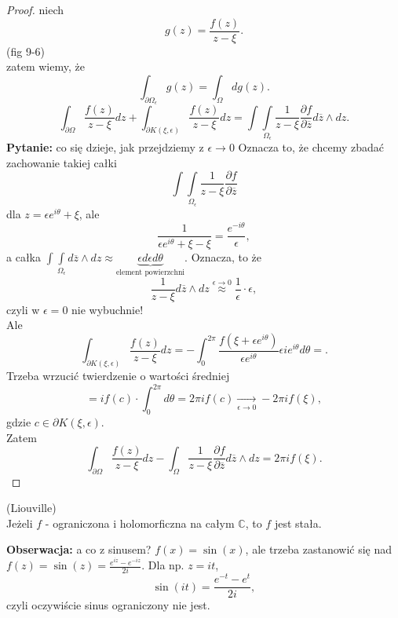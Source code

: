 \documentclass[../main.tex]{subfiles}
\begin{document}
 \begin{proof}
     niech
     \[
         g(z) = \frac{f(z)}{z - \xi}
     .\]
 (fig 9-6)\\
     zatem wiemy, że
     \[
         \int_{\partial \Omega_\epsilon}g(z) = \int_{\Omega} d g(z)
     .\]
 \[
     \int_{\partial \Omega} \frac{f(z)}{z - \xi}dz + \int_{\partial K(\xi, \epsilon)} \frac{f(z)}{z - \xi}dz = \int\int\limits_{\Omega_\epsilon}\frac{1}{z-\xi} \frac{\partial f}{\partial \overline{z}} d\overline{z}\land dz
 .\]
 \textbf{Pytanie:} co się dzieje, jak przejdziemy z $\epsilon\to 0$ Oznacza to, że chcemy zbadać zachowanie takiej całki
     \[
         \int\int\limits_{\Omega_{\epsilon}} \frac{1}{z-\xi}\frac{\partial f}{\partial \overline{z}}
     \]
 dla $z = \epsilon e^{i\theta} + \xi$, ale
     \[
         \frac{1}{\epsilon e^{i\theta} + \xi - \xi} = \frac{e^{-i\theta}}{\epsilon}
     ,\]
 a całka $\int\int\limits_{\Omega_\epsilon} d\overline{z}\land dz \approx \underbrace{\epsilon d\epsilon d\theta}_{\text{element powierzchni}}$.
     Oznacza, to że
     \[
         \frac{1}{z-\xi} d\overline{z}\land dz \overset{\epsilon \to 0}{\approx} \frac{1}{\epsilon} \cdot \epsilon
     ,\]
 czyli w $\epsilon = 0$ nie wybuchnie!\\
     Ale
     \[
         \int_{\partial K(\xi, \epsilon)} \frac{f(z)}{z-\xi} dz = - \int_0^{2\pi} \frac{f(\xi + \epsilon e^{i\theta})}{\epsilon e^{i\theta}} \epsilon i e^{i\theta} d\theta =
     .\]
 Trzeba wrzucić twierdzenie o wartości średniej
     \[
         = i f(c) \cdot \int_{0}^{2\pi}d\theta = 2 \pi i f(c) \underset{\epsilon \to 0}{\longrightarrow}-2\pi i f(\xi)
     ,\]
 gdzie $c\in \partial K(\xi, \epsilon)$.\\
     Zatem
     \[
         \int_{\partial \Omega} \frac{f(z)}{z - \xi}dz - \int_{\Omega}\frac{1}{z-\xi}\frac{\partial f}{\partial \overline{z}} d\overline{z}\land dz = 2 \pi i f(\xi)
     .\]
\end{proof}
\begin{tw}
    (Liouville)\\
    Jeżeli $f$ - ograniczona i holomorficzna na całym $\mathbb{C}$, to $f$ jest stała.
\end{tw}
\textbf{Obserwacja:} a co z sinusem?
$f(x) = \sin(x)$, ale trzeba zastanowić się nad  $f(z) = \sin(z) = \frac{e^{iz} - e^{-iz}}{2i}$. Dla np. $z = it$,
\[
    \sin(it) = \frac{e^{-t} - e^{t}}{2i}
,\]
czyli oczywiście sinus ograniczony nie jest.
\end{document}
